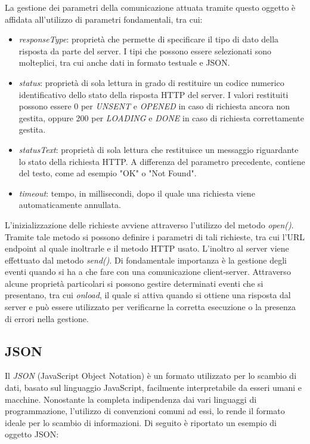 La gestione dei parametri della comunicazione attuata tramite questo oggetto è affidata all'utilizzo di parametri fondamentali, tra cui:

\begin{itemize}
    \item  \emph{responseType}: proprietà che permette di specificare il tipo di dato della risposta da parte del server.
    I tipi che possono essere selezionati sono molteplici, tra cui anche dati in formato testuale e JSON.

    \item \emph{status}: proprietà di sola lettura in grado di restituire un codice numerico identificativo dello stato della risposta HTTP del server. I valori restituiti possono essere 0 per \emph{UNSENT} e \emph{OPENED} in caso di richiesta ancora non gestita, oppure 200 per \emph{LOADING} e \emph{DONE} in caso di richiesta correttamente gestita.
    
    \item \textit{statusText}: proprietà di sola lettura che restituisce un messaggio riguardante lo stato della richiesta HTTP.
    A differenza del parametro precedente, contiene del testo, come ad esempio "OK" o "Not Found".

    \item \textit{timeout}: tempo, in millisecondi, dopo il quale una richiesta viene automaticamente annullata.
\end{itemize}


L'inizializzazione delle richieste avviene attraverso l'utilizzo del metodo \emph{open()}.
Tramite tale metodo si possono definire i parametri di tali richieste, tra cui l'URL endpoint al quale inoltrarle e il metodo HTTP usato.
L'inoltro al server viene effettuato dal metodo \emph{send()}.
Di fondamentale importanza è la gestione degli eventi quando si ha a che fare con una comunicazione client-server.
Attraverso alcune proprietà particolari si possono gestire determinati eventi che si presentano, tra cui \emph{onload}, il quale si attiva quando si ottiene una risposta dal server e può essere utilizzato per verificarne la corretta esecuzione o la presenza di errori nella gestione.

\thispagestyle{mystyle}
\subsection{JSON}
Il \emph{JSON} (JavaScript Object Notation) \cite{JsonDocs} è un formato utilizzato per lo scambio di dati, basato sul linguaggio JavaScript, facilmente interpretabile da esseri umani e macchine.
Nonostante la completa indipendenza dai vari linguaggi di programmazione, l'utilizzo di convenzioni comuni ad essi, lo rende il formato ideale per lo scambio di informazioni.
Di seguito è riportato un esempio di oggetto JSON:

